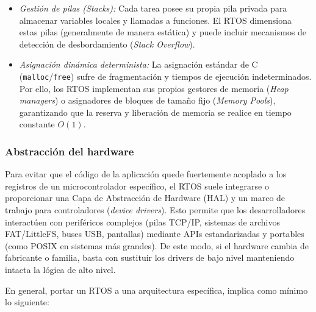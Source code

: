 \documentclass[../main.tex]{subfiles}
\begin{document}
            \begin{itemize}
                \item \emph{Gestión de pilas (\emph{Stacks}):} Cada tarea posee su propia pila privada para almacenar variables locales y llamadas a funciones. El RTOS dimensiona estas pilas (generalmente de manera estática) y puede incluir mecanismos de detección de desbordamiento (\emph{Stack Overflow}).
                \item \emph{Asignación dinámica determinista:} La asignación estándar de C (\texttt{malloc}/\texttt{free}) sufre de fragmentación y tiempos de ejecución indeterminados. Por ello, los RTOS implementan sus propios gestores de memoria (\emph{Heap managers}) o asignadores de bloques de tamaño fijo (\emph{Memory Pools}), garantizando que la reserva y liberación de memoria se realice en tiempo constante $O(1)$.
            \end{itemize}

        \subsubsection{Abstracción del hardware} 
            Para evitar que el código de la aplicación quede fuertemente acoplado a los registros de un microcontrolador específico, el RTOS suele integrarse o proporcionar una Capa de Abstracción de Hardware (HAL) y un marco de trabajo para controladores (\emph{device drivers}). Esto permite que los desarrolladores interactúen con periféricos complejos (pilas TCP/IP, sistemas de archivos FAT/LittleFS, buses USB, pantallas) mediante APIs estandarizadas y portables (como POSIX en sistemas más grandes). De este modo, si el hardware cambia de fabricante o familia, basta con sustituir los drivers de bajo nivel manteniendo intacta la lógica de alto nivel.

            En general, portar un RTOS a una arquitectura específica, implica como mínimo lo siguiente:
\end{document}
